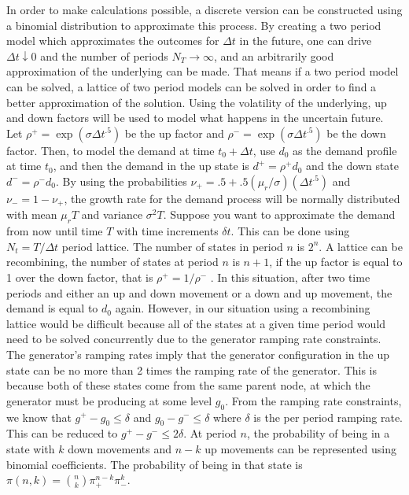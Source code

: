 	In order to make calculations possible, a discrete version can be constructed using a binomial distribution to approximate this process.  By creating a two period model which approximates the outcomes for $\Delta t$ in the future, one can drive $\Delta t  \downarrow 0 $ and the number of periods $N_T \rightarrow \infty$, and an arbitrarily good approximation of the underlying can be made.  That means if a two period model can be solved, a lattice of two period models can be solved in order to find a better approximation of the solution.  Using the volatility of the underlying, up and down factors will be used to model what happens in the uncertain future.  Let $\rho^+=\exp ⁡(\sigma \Delta t^.5)$ be the up factor and $\rho^-=\exp⁡ (\sigma \Delta t^.5)$ be the down factor.  Then, to model the demand at time $t_0+ \Delta t$, use $d_0$ as the demand profile at time $t_0$, and then the demand in the up state is $d^+=\rho^+ d_0$ and the down state $d^-=\rho^- d_0$.  By using the probabilities $\nu_+= .5+ .5(\mu_r/\sigma)(\Delta t^.5 )$ and $\nu_-  =1-\nu_+$, the growth rate for the demand process will be normally distributed with mean $\mu_rT$ and variance $\sigma^2 T$.
Suppose you want to approximate the demand from now until time $T$ with time increments $\delta t$.  This can be done using $N_t=T/\Delta t$ period lattice.  The number of states in period $n$ is $2^n$.  A lattice can be recombining, the number of states at period $n$ is $n+1$, if the up factor is equal to 1 over the down factor, that is $\rho^+=1/\rho^-$ .  In this situation, after two time periods and either an up and down movement or a down and up movement, the demand is equal to $d_0$ again.  However, in our situation using a recombining lattice would be difficult because all of the states at a given time period would need to be solved concurrently due to the generator ramping rate constraints.  The generator’s ramping rates imply that the generator configuration in the up state can be no more than 2 times the ramping rate of the generator.  This is because both of these states come from the same parent node, at which the generator must be producing at some level $g_0$.  From the ramping rate constraints, we know that $g^+-g_0\le \delta$ and $g_0-g^-\le \delta $ where $\delta$ is the per period ramping rate.  This can be reduced to $g^+-g^-\le2\delta  $.
At period $n$, the probability of being in a state with $k$ down movements and $n-k$ up movements can be represented using binomial coefficients.  The probability of being in that state is $ \pi (n,k) =  {n \choose k } \pi_+^{n-k} \pi_-^k$.

